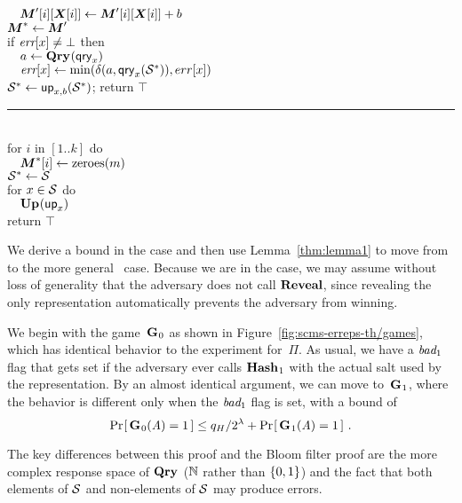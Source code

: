 \begin{figure*}
{      $\tab \v.M'[i][\v.X[i]] \gets \v.M'[i][\v.X[i]] + b$\\
    $\v.M^* \gets \v.M'$\\
    if $\textit{err}[x] \neq \bot$ then\\
      $\hspace*{10pt} a \gets \textup{\textbf{Qry}}\hspace{0.5pt}(\mathsf{qry}_x)$\\
      $\hspace*{10pt}\textit{err}[x] \gets \min(\delta(a,\mathsf{qry}_x(\mathcal{S}^*)),err[x])$\\
    $\mathcal{S}^* \gets \mathsf{up}_{x,b}(\mathcal{S}^*)$;
    return $\top$
  \vspace{6pt}\hrule\vspace{3pt}
  \oraclev{$\REPO(\col)$}\hfill{}\\[2pt]
    for $i$ in $[1..k]$ do\\
      $\tab \v.M^*[i] \gets \zeroes(m)$\\
    $\mathcal{S}^* \gets \mathcal{S}$\\
    for $x \in \mathcal{S}$ do\\
    $\hspace*{10pt}\textup{\textbf{Up}}\hspace{0.5pt}(\mathsf{up}_x)$\\
    return $\top$
}
\caption{Games 0--3 for proof of Theorem~\ref{thm:scms-erreps-th}.}
\label{fig:scms-erreps-th/games}
\end{figure*}

We derive a bound in the  case and then use Lemma~\ref{thm:lemma1} to
move from  to the more general \erreps\ case. Because we are in the
 case, we may assume without loss of generality that the adversary does
not call $\mathbf{Reveal}$, since revealing the only representation automatically prevents
the adversary from winning.

We begin with the game~$\textup{\textbf{G}}\hspace{0.5pt}_0$ as shown in Figure~\ref{fig:scms-erreps-th/games}, which has identical behavior to the 
experiment for~$\Pi$. As usual, we have a
$\textit{bad}_1$ flag that gets set if the adversary ever calls $\textup{\textbf{Hash}}\hspace{0.5pt}_1$ with the
actual salt used by the representation. By an almost identical argument, we can
move to~$\textup{\textbf{G}}\hspace{0.5pt}_1$, where the behavior is different only when the $\textit{bad}_1$ flag
is set, with a bound of
\begin{equation}
  \Pr\hspace{-1pt}\left[\,\textup{\textbf{G}}\hspace{0.5pt}_0(\mathit{A})=1\,\right] \leq
    q_H/2^\lambda + \Pr\hspace{-1pt}\left[\,\textup{\textbf{G}}\hspace{0.5pt}_1(\mathit{A})=1\,\right] \,.
\end{equation}

The key differences between this proof and the Bloom filter proof are the more
complex response space of $\textup{\textbf{Qry}}\hspace{0.5pt}$ ($\mathbb{N}$ rather than $\{0,1\}$) and the fact that
both elements of $\mathcal{S}$ and non-elements of $\mathcal{S}$ may produce errors.

